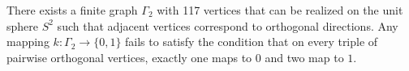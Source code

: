 There exists a finite graph $\Gamma_2$ with 117 vertices that can be realized on the unit sphere $S^2$ such that adjacent vertices correspond to orthogonal directions. Any mapping $k: \Gamma_2 \to \{0,1\}$ fails to satisfy the condition that on every triple of pairwise orthogonal vertices, exactly one maps to $0$ and two map to $1$.
